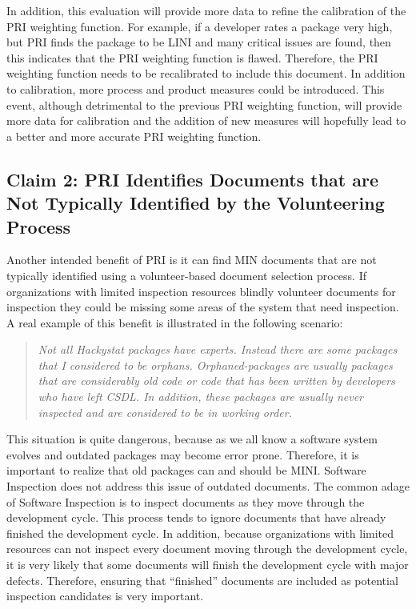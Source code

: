 In addition, this evaluation will provide more data to refine the
calibration of the PRI weighting function.  For example, if a developer
rates a package very high, but PRI finds the package to be LINI and many
critical issues are found, then this indicates that the PRI weighting
function is flawed. Therefore, the PRI weighting function needs to be
recalibrated to include this document. In addition to calibration, more
process and product measures could be introduced. This event, although
detrimental to the previous PRI weighting function, will provide more data
for calibration and the addition of new measures will hopefully lead to a
better and more accurate PRI weighting function.



\subsection{Claim 2: PRI Identifies Documents that are Not Typically
  Identified by the Volunteering Process}
\label{sec:claim2}
Another intended benefit of PRI is it can find MIN documents that are not
typically identified using a volunteer-based document selection process.
If organizations with limited inspection resources blindly volunteer
documents for inspection they could be missing some areas of the system
that need inspection. A real example of this benefit is illustrated in the
following scenario:

\begin{quotation}
  \textit{ Not all Hackystat packages have experts. Instead there are some
    packages that I considered to be orphans. Orphaned-packages are usually
    packages that are considerably old code or code that has been written
    by developers who have left CSDL. In addition, these packages are
    usually never inspected and are considered to be in working order.  }
\end{quotation}

This situation is quite dangerous, because as we all know a software system
evolves and outdated packages may become error prone. Therefore, it is
important to realize that old packages can and should be MINI. Software
Inspection \cite{Gilb93} does not address this issue of outdated documents.
The common adage of Software Inspection is to inspect documents as they
move through the development cycle. This process tends to ignore documents
that have already finished the development cycle. In addition, because
organizations with limited resources can not inspect every document moving
through the development cycle, it is very likely that some documents will
finish the development cycle with major defects.  Therefore, ensuring that
``finished'' documents are included as potential inspection candidates is
very important.

